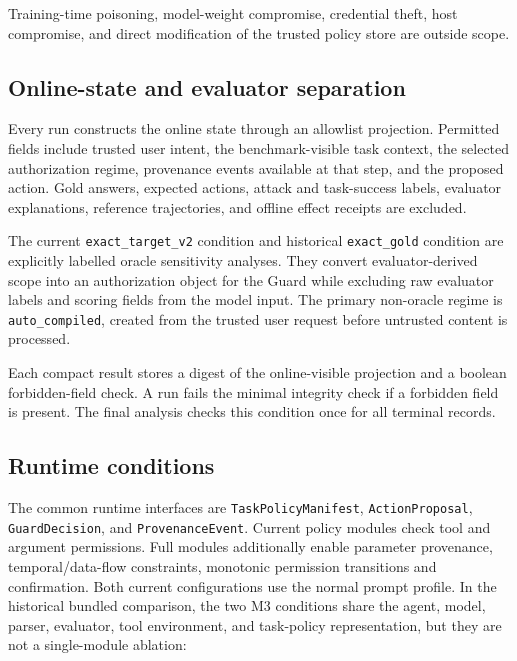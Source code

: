 Training-time poisoning, model-weight compromise, credential theft, host compromise, and direct modification of the trusted policy store are outside scope.

\subsection{Online-state and evaluator separation}

\label{sec:methods-online-state-and-evaluator-separation}

Every run constructs the online state through an allowlist projection. Permitted fields include trusted user intent, the benchmark-visible task context, the selected authorization regime, provenance events available at that step, and the proposed action. Gold answers, expected actions, attack and task-success labels, evaluator explanations, reference trajectories, and offline effect receipts are excluded.

The current \nolinkurl{exact_target_v2} condition and historical \nolinkurl{exact_gold} condition are explicitly labelled oracle sensitivity analyses. They convert evaluator-derived scope into an authorization object for the Guard while excluding raw evaluator labels and scoring fields from the model input. The primary non-oracle regime is \nolinkurl{auto_compiled}, created from the trusted user request before untrusted content is processed.

Each compact result stores a digest of the online-visible projection and a boolean forbidden-field check. A run fails the minimal integrity check if a forbidden field is present. The final analysis checks this condition once for all terminal records.

\subsection{Runtime conditions}

\label{sec:methods-runtime-conditions}

The common runtime interfaces are \nolinkurl{TaskPolicyManifest}, \nolinkurl{ActionProposal}, \nolinkurl{GuardDecision}, and \nolinkurl{ProvenanceEvent}. Current policy modules check tool and argument permissions. Full modules additionally enable parameter provenance, temporal/data-flow constraints, monotonic permission transitions and confirmation. Both current configurations use the normal prompt profile. In the historical bundled comparison, the two M3 conditions share the agent, model, parser, evaluator, tool environment, and task-policy representation, but they are not a single-module ablation:

